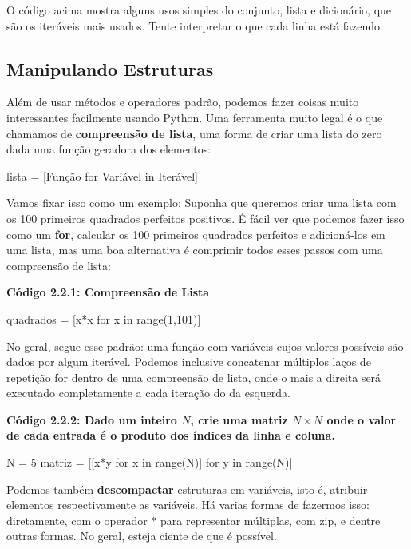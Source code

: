 \documentclass[11pt, a4paper]{article}
\begin{document}
O código acima mostra alguns usos simples do conjunto, lista e dicionário, que são os iteráveis mais usados. Tente interpretar o que cada linha está fazendo.

\subsection{Manipulando Estruturas}

Além de usar métodos e operadores padrão, podemos fazer coisas muito interessantes facilmente usando Python. Uma ferramenta muito legal é o que chamamos de \textbf{compreensão de lista}, uma forma de criar uma lista do zero dada uma função geradora dos elementos:

\begin{code}
lista = [Função for Variável in Iterável]
\end{code}

Vamos fixar isso como um exemplo: Suponha que queremos criar uma lista com os 100 primeiros quadrados perfeitos positivos. É fácil ver que podemos fazer isso como um \textbf{for}, calcular os 100 primeiros quadrados perfeitos e adicioná-los em uma lista, mas uma boa alternativa é comprimir todos esses passos com uma compreensão de lista:

\textbf{Código 2.2.1: Compreensão de Lista}

\begin{code}
quadrados = [x*x for x in range(1,101)]
\end{code}

No geral, segue esse padrão: uma função com variáveis cujos valores possíveis são dados por algum iterável. Podemos inclusive concatenar múltiplos laços de repetição for dentro de uma compreensão de lista, onde o mais a direita será executado completamente a cada iteração do da esquerda.

\textbf{Código 2.2.2: Dado um inteiro \(N\), crie uma matriz \(N\times N\) onde o valor de cada entrada é o produto dos índices da linha e coluna.}

\begin{code}
N = 5
matriz = [[x*y for x in range(N)] for y in range(N)]
\end{code}

Podemos também \textbf{descompactar} estruturas em variáveis, isto é, atribuir elementos respectivamente as variáveis. Há varias formas de fazermos isso: diretamente, com o operador \(*\) para representar múltiplas, com zip, e dentre outras formas. No geral, esteja ciente de que é possível.
\end{document}

